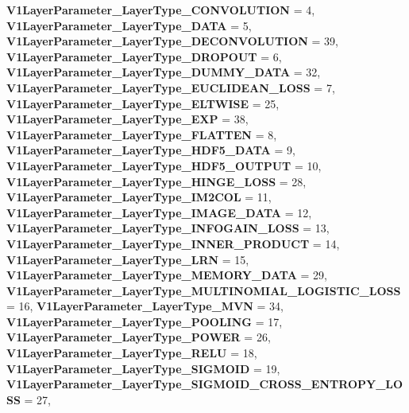 \begin{DoxyCompactItemize}
{\bfseries V1\+Layer\+Parameter\+\_\+\+Layer\+Type\+\_\+\+C\+O\+N\+V\+O\+L\+U\+T\+I\+ON} = 4, 
\newline
{\bfseries V1\+Layer\+Parameter\+\_\+\+Layer\+Type\+\_\+\+D\+A\+TA} = 5, 
{\bfseries V1\+Layer\+Parameter\+\_\+\+Layer\+Type\+\_\+\+D\+E\+C\+O\+N\+V\+O\+L\+U\+T\+I\+ON} = 39, 
{\bfseries V1\+Layer\+Parameter\+\_\+\+Layer\+Type\+\_\+\+D\+R\+O\+P\+O\+UT} = 6, 
{\bfseries V1\+Layer\+Parameter\+\_\+\+Layer\+Type\+\_\+\+D\+U\+M\+M\+Y\+\_\+\+D\+A\+TA} = 32, 
\newline
{\bfseries V1\+Layer\+Parameter\+\_\+\+Layer\+Type\+\_\+\+E\+U\+C\+L\+I\+D\+E\+A\+N\+\_\+\+L\+O\+SS} = 7, 
{\bfseries V1\+Layer\+Parameter\+\_\+\+Layer\+Type\+\_\+\+E\+L\+T\+W\+I\+SE} = 25, 
{\bfseries V1\+Layer\+Parameter\+\_\+\+Layer\+Type\+\_\+\+E\+XP} = 38, 
{\bfseries V1\+Layer\+Parameter\+\_\+\+Layer\+Type\+\_\+\+F\+L\+A\+T\+T\+EN} = 8, 
\newline
{\bfseries V1\+Layer\+Parameter\+\_\+\+Layer\+Type\+\_\+\+H\+D\+F5\+\_\+\+D\+A\+TA} = 9, 
{\bfseries V1\+Layer\+Parameter\+\_\+\+Layer\+Type\+\_\+\+H\+D\+F5\+\_\+\+O\+U\+T\+P\+UT} = 10, 
{\bfseries V1\+Layer\+Parameter\+\_\+\+Layer\+Type\+\_\+\+H\+I\+N\+G\+E\+\_\+\+L\+O\+SS} = 28, 
{\bfseries V1\+Layer\+Parameter\+\_\+\+Layer\+Type\+\_\+\+I\+M2\+C\+OL} = 11, 
\newline
{\bfseries V1\+Layer\+Parameter\+\_\+\+Layer\+Type\+\_\+\+I\+M\+A\+G\+E\+\_\+\+D\+A\+TA} = 12, 
{\bfseries V1\+Layer\+Parameter\+\_\+\+Layer\+Type\+\_\+\+I\+N\+F\+O\+G\+A\+I\+N\+\_\+\+L\+O\+SS} = 13, 
{\bfseries V1\+Layer\+Parameter\+\_\+\+Layer\+Type\+\_\+\+I\+N\+N\+E\+R\+\_\+\+P\+R\+O\+D\+U\+CT} = 14, 
{\bfseries V1\+Layer\+Parameter\+\_\+\+Layer\+Type\+\_\+\+L\+RN} = 15, 
\newline
{\bfseries V1\+Layer\+Parameter\+\_\+\+Layer\+Type\+\_\+\+M\+E\+M\+O\+R\+Y\+\_\+\+D\+A\+TA} = 29, 
{\bfseries V1\+Layer\+Parameter\+\_\+\+Layer\+Type\+\_\+\+M\+U\+L\+T\+I\+N\+O\+M\+I\+A\+L\+\_\+\+L\+O\+G\+I\+S\+T\+I\+C\+\_\+\+L\+O\+SS} = 16, 
{\bfseries V1\+Layer\+Parameter\+\_\+\+Layer\+Type\+\_\+\+M\+VN} = 34, 
{\bfseries V1\+Layer\+Parameter\+\_\+\+Layer\+Type\+\_\+\+P\+O\+O\+L\+I\+NG} = 17, 
\newline
{\bfseries V1\+Layer\+Parameter\+\_\+\+Layer\+Type\+\_\+\+P\+O\+W\+ER} = 26, 
{\bfseries V1\+Layer\+Parameter\+\_\+\+Layer\+Type\+\_\+\+R\+E\+LU} = 18, 
{\bfseries V1\+Layer\+Parameter\+\_\+\+Layer\+Type\+\_\+\+S\+I\+G\+M\+O\+ID} = 19, 
{\bfseries V1\+Layer\+Parameter\+\_\+\+Layer\+Type\+\_\+\+S\+I\+G\+M\+O\+I\+D\+\_\+\+C\+R\+O\+S\+S\+\_\+\+E\+N\+T\+R\+O\+P\+Y\+\_\+\+L\+O\+SS} = 27, 

\end{DoxyCompactItemize}
